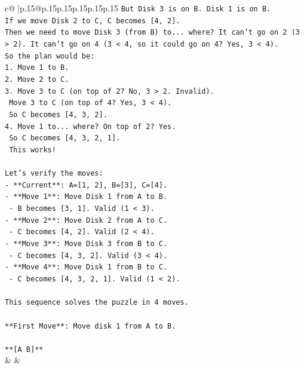 \documentclass{article}
\begin{document}
{\begin{supertabular}{c@{$\;$}|p{.15\linewidth}@{}p{.15\linewidth}p{.15\linewidth}p{.15\linewidth}p{.15\linewidth}p{.15\linewidth}}
{{{\texttt{But Disk 3 is on B. Disk 1 is on B.} \\
\texttt{If we move Disk 2 to C, C becomes {[}4, 2{]}.} \\
\texttt{Then we need to move Disk 3 (from B) to... where? It can't go on 2 (3 > 2). It can't go on 4 (3 < 4, so it could go on 4? Yes, 3 < 4).} \\
\texttt{So the plan would be:} \\
\texttt{1. Move 1 to B.} \\
\texttt{2. Move 2 to C.} \\
\texttt{3. Move 3 to C (on top of 2? No, 3 > 2. Invalid).} \\
\texttt{   Move 3 to C (on top of 4? Yes, 3 < 4).} \\
\texttt{   So C becomes {[}4, 3, 2{]}.} \\
\texttt{4. Move 1 to... where? On top of 2? Yes.} \\
\texttt{   So C becomes {[}4, 3, 2, 1{]}.} \\
\texttt{   This works!} \\
\\ 
\texttt{Let's verify the moves:} \\
\texttt{{-} **Current**: A={[}1, 2{]}, B={[}3{]}, C={[}4{]}.} \\
\texttt{{-} **Move 1**: Move Disk 1 from A to B.} \\
\texttt{  {-} B becomes {[}3, 1{]}. Valid (1 < 3).} \\
\texttt{{-} **Move 2**: Move Disk 2 from A to C.} \\
\texttt{  {-} C becomes {[}4, 2{]}. Valid (2 < 4).} \\
\texttt{{-} **Move 3**: Move Disk 3 from B to C.} \\
\texttt{  {-} C becomes {[}4, 3, 2{]}. Valid (3 < 4).} \\
\texttt{{-} **Move 4**: Move Disk 1 from B to C.} \\
\texttt{  {-} C becomes {[}4, 3, 2, 1{]}. Valid (1 < 2).} \\
\\ 
\texttt{This sequence solves the puzzle in 4 moves.} \\
\\ 
\texttt{**First Move**: Move disk 1 from A to B.} \\
\\ 
\texttt{**{[}A B{]}**} \\
            }
        }
    }
    & & \\ \\


\end{supertabular}}
\end{document}
